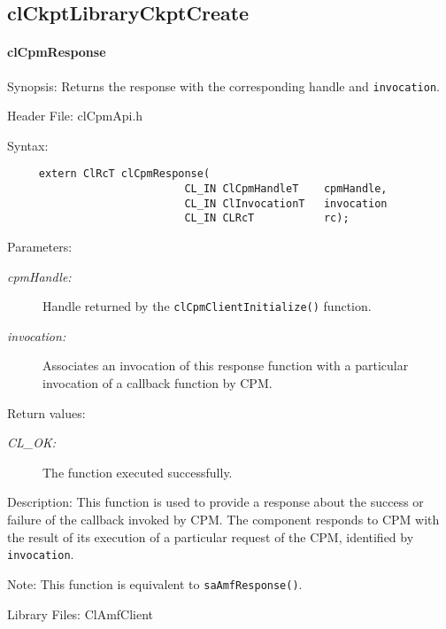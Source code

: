 {\subsection{clCkptLibraryCkptCreate}
\hypertarget{pagecpm115}{}\paragraph{cl\-Cpm\-Response}\label{pagecpm115}
\begin{Desc}
\item[Synopsis:]Returns the response with the corresponding handle and {\tt{invocation}}.\end{Desc}
\begin{Desc}
\item[Header File:]clCpmApi.h\end{Desc}
\begin{Desc}
\item[Syntax:]

\footnotesize\begin{verbatim}     extern ClRcT clCpmResponse(
                			CL_IN ClCpmHandleT    cpmHandle,
                			CL_IN ClInvocationT   invocation
                			CL_IN CLRcT           rc);
\end{verbatim}
\normalsize
\end{Desc}
\begin{Desc}
\item[Parameters:]
\begin{description}
\item[{\em cpm\-Handle:}]Handle returned by the {\tt{cl\-Cpm\-Client\-Initialize()}} function. 
\item[{\em invocation:}]Associates an invocation of this response function with a particular invocation of a callback function by CPM.
\end{description}
\end{Desc}
\begin{Desc}
\item[Return values:]
\begin{description}
\item[{\em CL\_\-OK:}]The function executed successfully.\end{description}
\end{Desc}
\begin{Desc}
\item[Description:]This function is used to provide a response about the success or failure of the callback invoked by CPM. The component responds to CPM 
with the result of its execution of a particular request of the CPM, identified by {\tt{invocation}}.\end{Desc}
\begin{Desc}
\item[Note:]This function is equivalent to {\tt{sa\-Amf\-Response()}}.\end{Desc}
\begin{Desc}
\item[Library Files:]Cl\-Amf\-Client\end{Desc}

}
